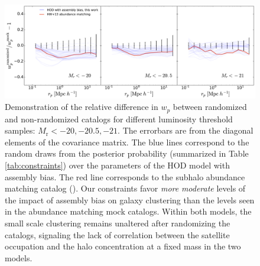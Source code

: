 \documentclass[twocolumn]{aastex61}
\begin{document}
\begin{figure}[p]~\\
\begin{center}
\includegraphics[width=\textwidth]{paper_wprandom.pdf}
 \caption{Demonstration of the relative difference in $w_{p}$ between randomized and non-randomized catalogs for different luminosity threshold samples: $M_{\mathrm r}<-20,-20.5,-21$. The errorbars are from the diagonal elements of the covariance matrix. The blue lines correspond to the random draws from the posterior probability (summarized in Table \ref{tab:constraints}) over the parameters of the HOD model with assembly bias. The red line corresponds to the subhalo abundance matching catalog (\citealt{hw2013,hearin2014}). Our constraints favor \emph{more} \emph{moderate} levels of the impact of assembly bias on galaxy clustering than the levels seen in the abundance matching mock catalogs. Within both models, the small scale clustering remains unaltered after randomizing the catalogs, signaling the lack of correlation between the satellite occupation and the halo concentration at a fixed mass in the two models.}
\label{fig:randomized}
\end{center}
\end{figure}

\end{document}

